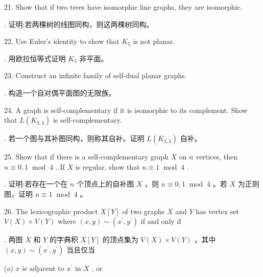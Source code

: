 \documentclass[10pt]{article}
\begin{document}
21. Show that if two trees have isomorphic line graphs, they are isomorphic.

\begin{tcolorbox}. 证明:若两棵树的线图同构，则这两棵树同构。
\end{tcolorbox}

22. Use Euler's identity to show that \({K}_{5}\) is not planar.

\begin{tcolorbox}. 用欧拉恒等式证明 \({K}_{5}\) 非平面。
\end{tcolorbox}

23. Construct an infinite family of self-dual planar graphs.

\begin{tcolorbox}. 构造一个自对偶平面图的无限族。
\end{tcolorbox}

24. A graph is self-complementary if it is isomorphic to its complement. Show that \(L\left( {K}_{3,3}\right)\) is self-complementary.

\begin{tcolorbox}. 若一个图与其补图同构，则称其自补。证明 \(L\left( {K}_{3,3}\right)\) 自补。
\end{tcolorbox}

25. Show that if there is a self-complementary graph \(X\) on \(n\) vertices, then \(n \equiv  0,1{\;\operatorname{mod}\;4}\) . If \(X\) is regular, show that \(n \equiv  1{\;\operatorname{mod}\;4}\) .

\begin{tcolorbox}. 证明:若存在一个在 \(n\) 个顶点上的自补图 \(X\) ，则 \(n \equiv  0,1{\;\operatorname{mod}\;4}\) 。若 \(X\) 为正则图，证明 \(n \equiv  1{\;\operatorname{mod}\;4}\) 。
\end{tcolorbox}

26. The lexicographic product \(X\left\lbrack  Y\right\rbrack\) of two graphs \(X\) and \(Y\) has vertex set \(V\left( X\right)  \times  V\left( Y\right)\) where \(\left( {x,y}\right)  \sim  \left( {{x}^{\prime },{y}^{\prime }}\right)\) if and only if

\begin{tcolorbox}. 两图 \(X\) 和 \(Y\) 的字典积 \(X\left\lbrack  Y\right\rbrack\) 的顶点集为 \(V\left( X\right)  \times  V\left( Y\right)\) ，其中 \(\left( {x,y}\right)  \sim  \left( {{x}^{\prime },{y}^{\prime }}\right)\) 当且仅当
\end{tcolorbox}

(a) \(x\) is adjacent to \({x}^{\prime }\) in \(X\) , or
\end{document}
